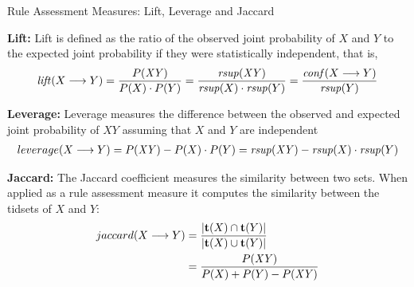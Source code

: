 \begin{frame}{Rule Assessment Measures: Lift, Leverage and Jaccard}

  {\bf Lift:}
Lift 
is def\/{i}ned as the ratio of the observed joint
probability of $X$ and $Y$ to the expected joint probability if they
were statistically independent, that is,
\begin{align*}
   \lift (X \arule Y) = \frac{P(\mathit{XY})}{P(X) \cdot P(Y)} =
   \frac{\rsupp(\mathit{XY})}{\rsupp(X)\cdot\rsupp(Y)} = \frac{\conff(X\arule
   Y)}{\rsupp(Y)}
\end{align*}

\medskip
{\bf Leverage:}
Leverage 
measures the difference between the
observed and expected joint probability of $XY$ assuming that $X$ and
$Y$ are independent
\begin{align*}
  \leverage (X \arule Y) = P(\mathit{XY}) - P(X) \cdot P(Y) = \rsupp(\mathit{XY}) -
  \rsupp(X) \cdot \rsupp(Y)
\end{align*}

{\bf Jaccard:}
The Jaccard coeff\/{i}cient
measures the similarity
between
two sets. When applied as a rule assessment measure it computes the
similarity between the tidsets of $X$ and $Y$:
\begin{align*}
\jaccard (X \arule Y) & =
\frac{\card{\vT(X) \cap \vT(Y)}}{\card{\vT(X) \cup \vT(Y)}}\\
& = \frac{P(\mathit{XY})}{P(X)+P(Y)-P(\mathit{XY})}
\end{align*}


\end{frame}


